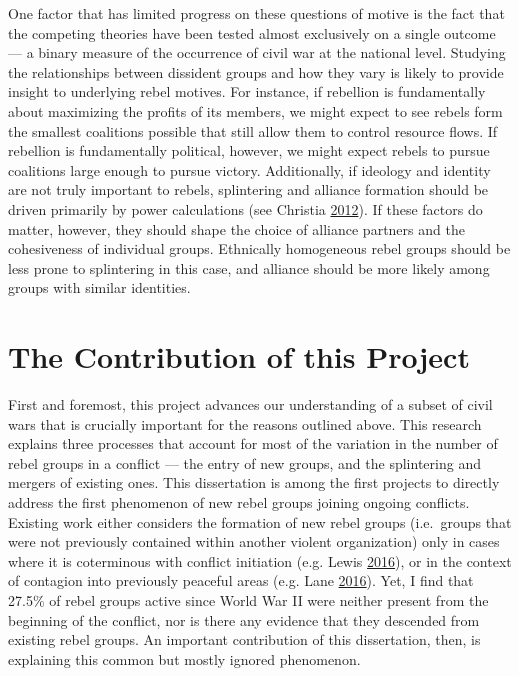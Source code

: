 \documentclass[12pt,]{book}
\theoremstyle{definition}
\theoremstyle{definition}
\theoremstyle{definition}
\theoremstyle{remark}
\begin{document}
One factor that has limited progress on these questions of motive is the
fact that the competing theories have been tested almost exclusively on
a single outcome --- a binary measure of the occurrence of civil war at
the national level. Studying the relationships between dissident groups
and how they vary is likely to provide insight to underlying rebel
motives. For instance, if rebellion is fundamentally about maximizing
the profits of its members, we might expect to see rebels form the
smallest coalitions possible that still allow them to control resource
flows. If rebellion is fundamentally political, however, we might expect
rebels to pursue coalitions large enough to pursue victory.
Additionally, if ideology and identity are not truly important to
rebels, splintering and alliance formation should be driven primarily by
power calculations (see Christia
\protect\hyperlink{ref-Christia2012}{2012}). If these factors do matter,
however, they should shape the choice of alliance partners and the
cohesiveness of individual groups. Ethnically homogeneous rebel groups
should be less prone to splintering in this case, and alliance should be
more likely among groups with similar identities.

\hypertarget{the-contribution-of-this-project}{%
\section{The Contribution of this
Project}\label{the-contribution-of-this-project}}

First and foremost, this project advances our understanding of a subset
of civil wars that is crucially important for the reasons outlined
above. This research explains three processes that account for most of
the variation in the number of rebel groups in a conflict --- the entry
of new groups, and the splintering and mergers of existing ones. This
dissertation is among the first projects to directly address the first
phenomenon of new rebel groups joining ongoing conflicts. Existing work
either considers the formation of new rebel groups (i.e.~groups that
were not previously contained within another violent organization) only
in cases where it is coterminous with conflict initiation (e.g. Lewis
\protect\hyperlink{ref-Lewis2016}{2016}), or in the context of contagion
into previously peaceful areas (e.g. Lane
\protect\hyperlink{ref-Lane2016}{2016}). Yet, I find that 27.5\% of
rebel groups active since World War II were neither present from the
beginning of the conflict, nor is there any evidence that they descended
from existing rebel groups. An important contribution of this
dissertation, then, is explaining this common but mostly ignored
phenomenon.
\end{document}

